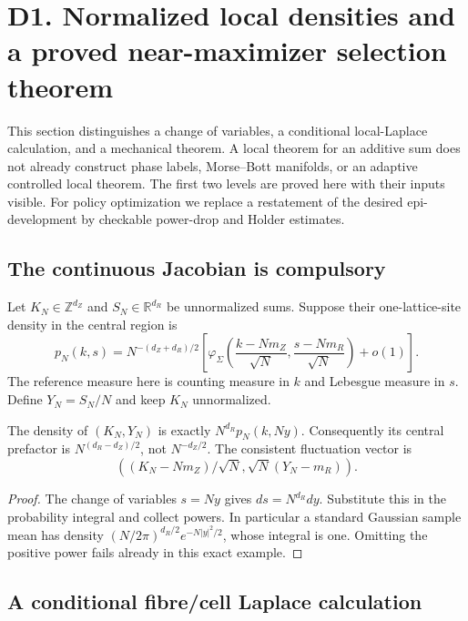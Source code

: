 \section{D1. Normalized local densities and a proved near-maximizer selection theorem}
\label{sec:r33-d1}

This section distinguishes a change of variables, a conditional local-Laplace
calculation, and a mechanical theorem.  A local theorem for an additive sum
does not already construct phase labels, Morse--Bott manifolds, or an adaptive
controlled local theorem.  The first two levels are proved here with their
inputs visible.  For policy optimization we replace a restatement of the
desired epi-development by checkable power-drop and Holder estimates.

\subsection{The continuous Jacobian is compulsory}

Let $K_N\in\mathbb Z^{d_Z}$ and $S_N\in\mathbb R^{d_R}$ be unnormalized
sums.  Suppose their one-lattice-site density in the central region is
\[
 p_N(k,s)=N^{-(d_Z+d_R)/2}
 \left[\varphi_\Sigma\left(
 \frac{k-Nm_Z}{\sqrt N},\frac{s-Nm_R}{\sqrt N}\right)+o(1)\right].
\]
The reference measure here is counting measure in $k$ and Lebesgue measure
in $s$.  Define $Y_N=S_N/N$ and keep $K_N$ unnormalized.

\begin{proposition}
\label{prop:r33-d1-jacobian}
The density of $(K_N,Y_N)$ is exactly $N^{d_R}p_N(k,Ny)$.
Consequently its central prefactor is $N^{(d_R-d_Z)/2}$, not
$N^{-d_Z/2}$.  The consistent fluctuation vector is
\[
 \left((K_N-Nm_Z)/\sqrt N,\sqrt N(Y_N-m_R)\right).
\]
\end{proposition}
\begin{proof}
The change of variables $s=Ny$ gives $ds=N^{d_R}dy$.  Substitute this in the
probability integral and collect powers.  In particular a standard Gaussian
sample mean has density $(N/2\pi)^{d_R/2}e^{-N|y|^2/2}$, whose integral is
one.  Omitting the positive power fails already in this exact example.
\end{proof}

\subsection{A conditional fibre/cell Laplace calculation}

